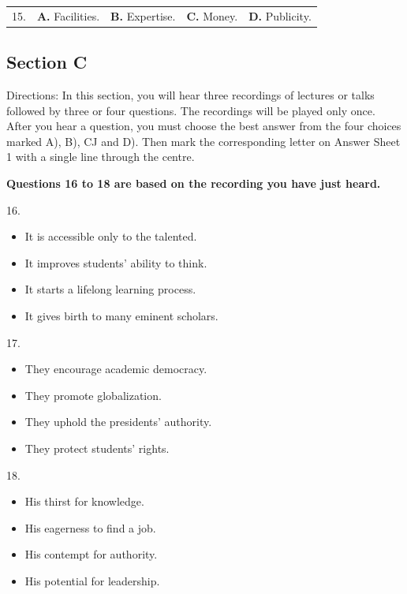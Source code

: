 \documentclass[UTF8,11pt]{ctexart}
\begin{document}
\noindent\begin{tabularx}{\linewidth}{@{}lXXXX@{}}15. & \textbf{A.} Facilities. & \textbf{B.} Expertise. & \textbf{C.} Money. & \textbf{D.} Publicity.\\\end{tabularx}\par

\subsection*{\textbf{Section C}}


Directions: In this section, you will hear three recordings of lectures or talks followed by three or four questions. The recordings will be played only once. After you hear a question, you must choose the best answer from the four choices marked A), B), CJ and D). Then mark the corresponding letter on Answer Sheet 1 with a single line through the centre.


\textbf{Questions 16 to 18 are based on the recording you have just heard.}


16.


\begin{itemize}[leftmargin=2em,itemsep=.2em,topsep=.4em]\item[A.] It is accessible only to the talented.
\item[B.] It improves students’ ability to think.
\item[C.] It starts a lifelong learning process.
\item[D.] It gives birth to many eminent scholars.
\end{itemize}

17.


\begin{itemize}[leftmargin=2em,itemsep=.2em,topsep=.4em]\item[A.] They encourage academic democracy.
\item[B.] They promote globalization.
\item[C.] They uphold the presidents’ authority.
\end{itemize}

\begin{itemize}[leftmargin=2em,itemsep=.2em,topsep=.4em]\item[D.] They protect students’ rights.
\end{itemize}

18.


\begin{itemize}[leftmargin=2em,itemsep=.2em,topsep=.4em]\item[A.] His thirst for knowledge.
\item[B.] His eagerness to find a job.
\item[C.] His contempt for authority.
\item[D.] His potential for leadership.
\end{itemize}
\end{document}
